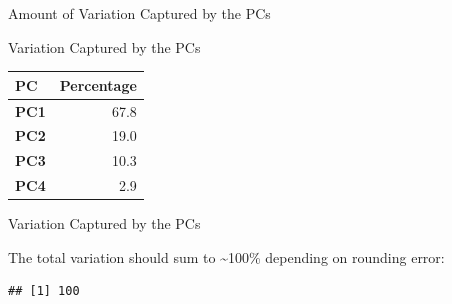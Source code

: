 \documentclass[ignorenonframetext,]{beamer}
\begin{document}
\begin{frame}[fragile]{Amount of Variation Captured by the PCs}
\begin{block}{Variation Captured by the PCs}
\begin{table}[H]
\centering\begingroup\fontsize{38}{40}\selectfont

\begin{tabular}{>{\bfseries}l|r}
\hline
\begingroup\fontsize{38}{40}\selectfont PC\endgroup & \begingroup\fontsize{38}{40}\selectfont Percentage\endgroup\\
\hline
PC1 & 67.8\\
\hline
PC2 & 19.0\\
\hline
PC3 & 10.3\\
\hline
PC4 & 2.9\\
\hline
\end{tabular}
\endgroup{}
\end{table}

\end{block}

\begin{block}{Variation Captured by the PCs}

The total variation should sum to \textasciitilde{}100\% depending on
rounding error:

\begin{verbatim}
## [1] 100
\end{verbatim}

\end{block}

\end{frame}
\end{document}
